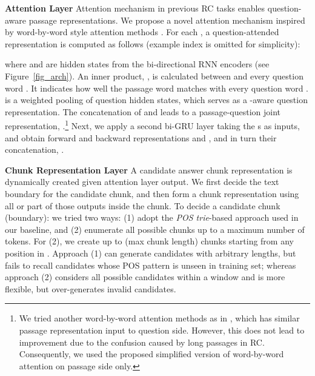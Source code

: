 \documentclass[letterpaper]{article}
\begin{document}
\noindent\textbf{Attention Layer}
Attention mechanism in previous RC tasks \cite{kadlec2016text,hermann2015teaching,sordoni2016iterative,dhingra2016gated,cui2016aoa,cui2016consensus} enables question-aware passage representations. We propose a novel attention mechanism inspired by word-by-word style attention methods \cite{rocktaschel2015reasoning,wang2015learning,santos2016attentive}. For each , a question-attended representation  is computed as follows (example index  is omitted for simplicity):

where  and  are hidden states from the bi-directional RNN encoders (see Figure~\ref{fig_arch}). An inner product, , is calculated between  and every question word . It indicates how well the passage word  matches with every question word .  is a weighted pooling of  question hidden states, which serves as a -aware question representation. The concatenation of  and  leads to a passage-question joint representation, .\footnote{We tried another word-by-word attention methods as in \cite{santos2016attentive}, which has similar passage representation input to question side. However, this does not lead to improvement due to the confusion caused by long passages in RC.
Consequently, we used the proposed simplified version of word-by-word attention on passage side only.} 
Next, we apply a second bi-GRU layer taking the s as inputs,
and obtain forward and backward representations  and  , and in turn their concatenation, .













\noindent\textbf{Chunk Representation Layer}
A candidate answer chunk representation is dynamically created given attention layer output. We first decide the text boundary for the candidate chunk, and then form a chunk representation using all or part of those  outputs inside the chunk. To decide a candidate chunk (boundary): we tried two ways: (1) adopt the \textit{POS trie}-based approach used in our baseline, and (2) enumerate all possible chunks up to a maximum number of tokens. For (2), we create up to  (max chunk length) chunks starting from any position  in . Approach (1) can generate candidates with arbitrary lengths, but fails to recall candidates whose POS pattern is unseen in training set; whereas approach (2) considers all possible candidates within a window and is more flexible, but over-generates invalid candidates.
\end{document}
